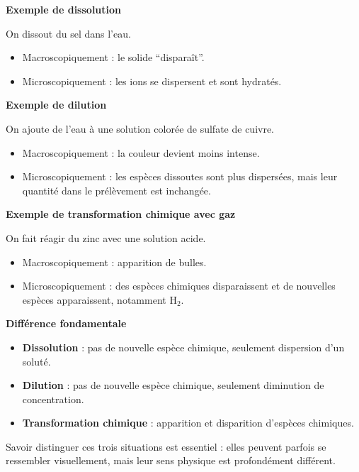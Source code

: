 \documentclass[11pt,a4paper]{article}
\begin{document}
\begin{corrigebox}
\textbf{Exemple de dissolution}

On dissout du sel dans l'eau.
\begin{itemize}
    \item Macroscopiquement : le solide ``disparaît''.
    \item Microscopiquement : les ions se dispersent et sont hydratés.
\end{itemize}

\textbf{Exemple de dilution}

On ajoute de l'eau à une solution colorée de sulfate de cuivre.
\begin{itemize}
    \item Macroscopiquement : la couleur devient moins intense.
    \item Microscopiquement : les espèces dissoutes sont plus dispersées, mais leur quantité dans le prélèvement est inchangée.
\end{itemize}

\textbf{Exemple de transformation chimique avec gaz}

On fait réagir du zinc avec une solution acide.
\begin{itemize}
    \item Macroscopiquement : apparition de bulles.
    \item Microscopiquement : des espèces chimiques disparaissent et de nouvelles espèces apparaissent, notamment \(\mathrm{H_2}\).
\end{itemize}

\textbf{Différence fondamentale}

\begin{itemize}
    \item \textbf{Dissolution} : pas de nouvelle espèce chimique, seulement dispersion d'un soluté.
    \item \textbf{Dilution} : pas de nouvelle espèce chimique, seulement diminution de concentration.
    \item \textbf{Transformation chimique} : apparition et disparition d'espèces chimiques.
\end{itemize}

\begin{bilanbox}
Savoir distinguer ces trois situations est essentiel : elles peuvent parfois se ressembler visuellement, mais leur sens physique est profondément différent.
\end{bilanbox}
\end{corrigebox}
\end{document}
